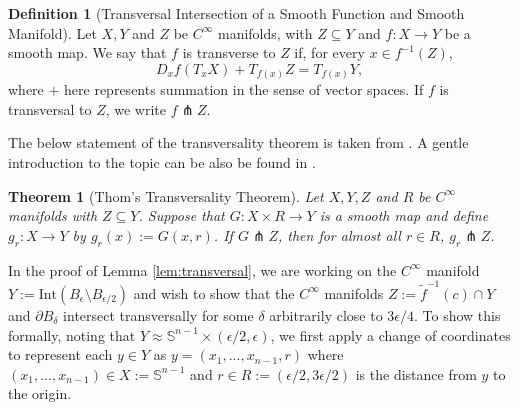 \documentclass[11pt]{article}
\newcommand{\1}{\mathbf{1}}
\newtheorem{thm}{Theorem}%
\theoremstyle{definition}
\newtheorem{defn}{Definition}%
\theoremstyle{remark}
\begin{document}
\begin{mdframed}
\begin{defn}[Transversal Intersection of a Smooth Function and Smooth Manifold]\label{def:transversal2}
    Let $X,Y$ and $Z$ be $C^\infty$ manifolds, with $Z\subseteq Y$ and $f: X \rightarrow Y$ be a smooth map. We say that $f$ is transverse to $Z$ if, for every $x \in f^{-1}(Z)$,
\begin{equation}\nonumber 
D_x f\left(T_x X\right)+T_{f(x)} Z=T_{f(x)} Y,
\end{equation}
where $+$ here represents summation in the sense of vector spaces. If $f$ is transversal to $Z$, we write $f \pitchfork Z$.
\end{defn} 
\end{mdframed}
The below statement of the transversality theorem is taken from \cite{guillemin2010differential}. A gentle introduction to the topic can be also be found in \cite{Greenblatt2015AnIT}.
\begin{mdframed}
    \begin{thm}[Thom's Transversality Theorem]\label{thm:thoms_transversal} Let $X, Y, Z$ and $R$ be $C^\infty$ manifolds with $Z\subseteq Y$. Suppose that $G: X \times R \rightarrow Y$ is a smooth map and define $g_r:X\rightarrow Y$ by $g_r(x):=G(x,r)$. If $G\pitchfork Z$, then for almost all $r \in R$, $g_r \pitchfork Z$.
    \end{thm}
    \vspace{0.2cm}
\end{mdframed}
In the proof of Lemma \ref{lem:transversal}, we are working on the $C^\infty$ manifold $Y:=\text{Int}(B_\epsilon\setminus B_{\epsilon/2})$ and wish to show that the $C^\infty$ manifolds $Z:=\tilde{f}^{-1}(c)\cap Y$ and $\partial B_{\delta}$ intersect transversally for some $\delta$ arbitrarily close to $3\epsilon/4$. To show this formally, noting that $Y\approx \mathbb{S}^{n-1}\times (\epsilon/2,\epsilon)$, we first apply a change of coordinates to represent each $y\in Y$ as $y=(x_1,...,x_{n-1},r)$ where $(x_1,...,x_{n-1})\in X:=\mathbb{S}^{n-1}$ and $r\in R:=(\epsilon/2,3\epsilon/2)$ is the distance from $y$ to the origin. 
\end{document}
